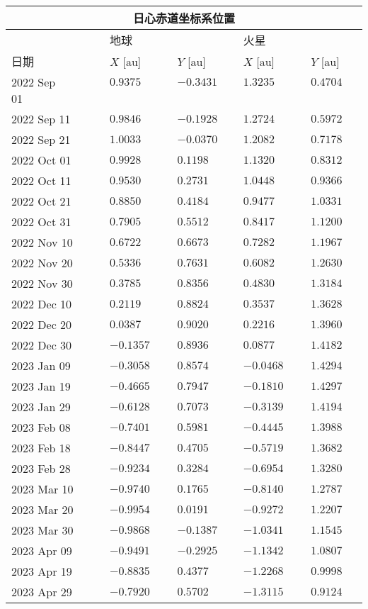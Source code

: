 \documentclass[a4paper,fontset=fandol]{ctexart}
\begin{document}
	\begin{table}[!h]
		\centering
		\begin{tabular}{|l|l|l|l|l|}
			\hline
			\multicolumn{5}{|c|}{日心赤道坐标系位置}\\
			\hline
			&\multicolumn{2}{|l|}{地球}&\multicolumn{2}{|l|}{火星}\\
			\hline
			日期&$X$ [au]&$Y$ [au]&$X$ [au]&$Y$ [au]\\
			\hline
			2022 Sep 01~~~~~~~~ & $0.9375$~~~~~~&$-0.3431$~~~~&$1.3235$~~~~~~&$0.4704$~~~~\\
			2022 Sep 11&$0.9846$&$-0.1928$&$1.2724$&$0.5972$\\
			2022 Sep 21 & $1.0033$ & $-0.0370$ & $1.2082$ & $0.7178$ \\
			2022 Oct 01 & $0.9928$ & $0.1198$ & $1.1320$ & $0.8312$ \\
			2022 Oct 11 & $0.9530$ & $0.2731$ & $1.0448$ & $0.9366$ \\
			\hline
			2022 Oct 21 & $0.8850$ & $0.4184$ & $0.9477$ & $1.0331$ \\
			2022 Oct 31 & $0.7905$ & $0.5512$ & $0.8417$ & $1.1200$ \\
			2022 Nov 10 & $0.6722$ & $0.6673$ & $0.7282$ & $1.1967$ \\
			2022 Nov 20 & $0.5336$ & $0.7631$ & $0.6082$ & $1.2630$ \\
			2022 Nov 30 & $0.3785$ & $0.8356$ & $0.4830$ & $1.3184$ \\
			\hline
			2022 Dec 10 & $0.2119$ & $0.8824$ & $0.3537$ & $1.3628$ \\
			2022 Dec 20 & $0.0387$ & $0.9020$ & $0.2216$ & $1.3960$ \\
			2022 Dec 30 & $-0.1357$ & $0.8936$ & $0.0877$ & $1.4182$ \\
			2023 Jan 09 & $-0.3058$ & $0.8574$ & $-0.0468$ & $1.4294$ \\
			2023 Jan 19 & $-0.4665$ & $0.7947$ & $-0.1810$ & $1.4297$ \\
			\hline
			2023 Jan 29 & $-0.6128$ & $0.7073$ & $-0.3139$ & $1.4194$ \\
			2023 Feb 08 & $-0.7401$ & $0.5981$ & $-0.4445$ & $1.3988$ \\
			2023 Feb 18 & $-0.8447$ & $0.4705$ & $-0.5719$ & $1.3682$ \\
			2023 Feb 28 & $-0.9234$ & $0.3284$ & $-0.6954$ & $1.3280$ \\
			2023 Mar 10 & $-0.9740$ & $0.1765$ & $-0.8140$ & $1.2787$ \\
			\hline
			2023 Mar 20 & $-0.9954$ & $0.0191$ & $-0.9272$ & $1.2207$ \\
			2023 Mar 30 & $-0.9868$ & $-0.1387$ & $-1.0341$ & $1.1545$ \\
			2023 Apr 09 & $-0.9491$ & $-0.2925$ & $-1.1342$ & $1.0807$ \\
			2023 Apr 19 & $-0.8835$ & $0.4377$ & $-1.2268$ & $0.9998$ \\
			2023 Apr 29 & $-0.7920$ & $0.5702$ & $-1.3115$ & $0.9124$ \\
			\hline
		\end{tabular}
	\end{table}
	
\end{document}
